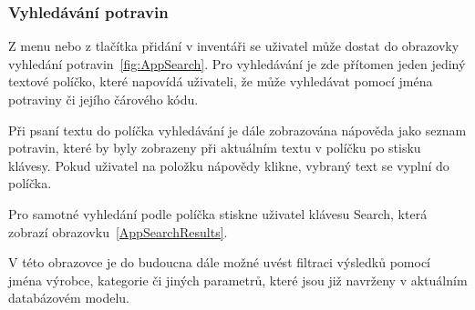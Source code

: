 \documentclass[thesis=B,czech]{FITthesis}[2013/10/20]
\begin{document}
\clearpage

\subsubsection{Vyhledávání potravin}

Z menu nebo z tlačítka přidání v inventáři se uživatel může dostat do obrazovky vyhledání potravin~\ref{fig:AppSearch}. Pro vyhledávání je zde přítomen jeden jediný textové políčko, které napovídá uživateli, že může vyhledávat pomocí jména potraviny či jejího čárového kódu.

Při psaní textu do políčka vyhledávání je dále zobrazována nápověda jako seznam potravin, které by byly zobrazeny při aktuálním textu v políčku po stisku klávesy. Pokud uživatel na položku nápovědy klikne, vybraný text se vyplní do políčka.

Pro samotné vyhledání podle políčka stiskne uživatel klávesu Search, která zobrazí obrazovku~\ref{AppSearchResults}.

V této obrazovce je do budoucna dále možné uvést filtraci výsledků pomocí jména výrobce, kategorie či jiných parametrů, které jsou již navrženy v aktuálním databázovém modelu.
\end{document}

